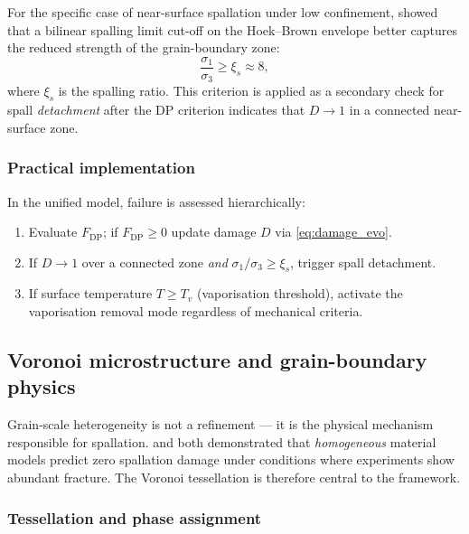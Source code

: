 \documentclass[12pt, a4paper]{article}
\begin{document}
For the specific case of near-surface spallation under low confinement,
\citet{vogler2020simulation} showed that a bilinear spalling limit cut-off on
the Hoek--Brown envelope better captures the reduced strength of the
grain-boundary zone:
\begin{equation}
    \frac{\sigma_1}{\sigma_3} \ge \xi_s \approx 8,
    \label{eq:HB_spall}
\end{equation}
where $\xi_s$ is the spalling ratio.  This criterion is applied as a secondary
check for spall \emph{detachment} after the DP criterion indicates that $D \to 1$
in a connected near-surface zone.

\subsubsection{Practical implementation}

In the unified model, failure is assessed hierarchically:
\begin{enumerate}[noitemsep]
    \item Evaluate $F_\mathrm{DP}$; if $F_\mathrm{DP} \ge 0$ update damage $D$
          via \cref{eq:damage_evo}.
    \item If $D \to 1$ over a connected zone \emph{and} $\sigma_1/\sigma_3
          \ge \xi_s$, trigger spall detachment.
    \item If surface temperature $T \ge T_v$ (vaporisation threshold), activate
          the vaporisation removal mode regardless of mechanical criteria.
\end{enumerate}

\subsection{Voronoi microstructure and grain-boundary physics}
\label{sec:voronoi}

Grain-scale heterogeneity is not a refinement — it is the physical mechanism
responsible for spallation.  \citet{vogler2020simulation} and
\citet{liu2023failure} both demonstrated that \emph{homogeneous} material models
predict zero spallation damage under conditions where experiments show abundant
fracture.  The Voronoi tessellation is therefore central to the framework.

\subsubsection{Tessellation and phase assignment}
\end{document}
